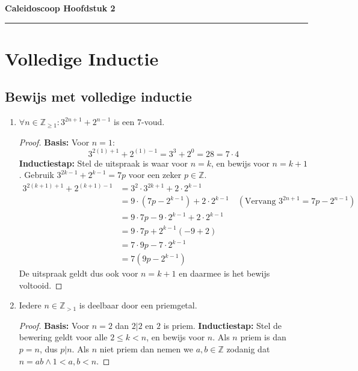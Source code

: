 \documentclass{article}
\begin{document}
\begin{center}
    \Large \textbf{Caleidoscoop Hoofdstuk 2}
\end{center}

\rule{\textwidth}{2pt}

\bigskip

\section{Volledige Inductie}

\subsection{Bewijs met volledige inductie}
\begin{enumerate}[label=\alph*)]
    \item $\forall n \in \mathbb{Z}_{\geq 1} : 3^{2n + 1} + 2^{n-1}$ is een $7$-voud.
        \begin{proof}
            \textbf{Basis:} Voor $n=1$:
            \[
                3^{2(1)+1} + 2^{(1)-1} = 3^3+2^0 = 28 = 7\cdot4
            \]
            \textbf{Inductiestap:}
            Stel de uitspraak is waar voor $n=k$, en bewijs voor $n=k+1$. Gebruik $3^{2k-1}+2^{k-1}=7p$ voor een zeker $p \in \mathbb{Z}$.    
            \begin{align*}
                3^{2(k+1)+1} + 2^{(k+1)-1} &= 3^2 \cdot 3^{2k+1} + 2 \cdot 2^{k-1} \\
                &= 9 \cdot (7p-2^{k-1}) + 2 \cdot 2^{k-1} \quad (\text{Vervang }3^{2n+1} = 7p-2^{n-1} )\\
                &= 9 \cdot 7p-9 \cdot 2^{k-1} + 2 \cdot 2^{k-1} \\
                &= 9 \cdot 7p+2^{k-1}(-9+2) \\
                &= 7 \cdot 9p-7 \cdot 2^{k-1} \\
                &= 7(9p-2^{k-1})
            \end{align*}
            De uitspraak geldt dus ook voor $n=k+1$ en daarmee is het bewijs voltooid.
        \end{proof}
    \item Iedere $n \in \mathbb{Z}_{>1}$ is deelbaar door een priemgetal.
        \begin{proof}
            \textbf{Basis:} Voor $n=2$ dan $2 | 2$ en $2$ is priem.
            \textbf{Inductiestap:} Stel de bewering geldt voor alle $2 \leq k < n$, en bewijs voor $n$.
            Als $n$ priem is dan $p = n$, dus $p | n$. Als $n$ niet priem dan nemen we $a, b \in \mathbb{Z}$ zodanig dat $n=ab \wedge 1 < a, b < n$.

\end{proof}
\end{enumerate}
\end{document}
